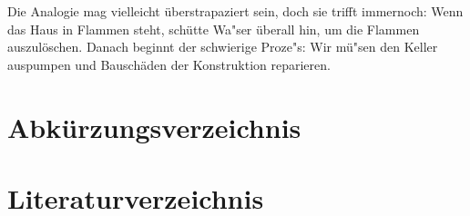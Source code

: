 \documentclass[
        onecolumn,
        a4paper,
        abstracton,
        parskip=half
        ,final
        ]{scrartcl}
\begin{document}
Die Analogie mag vielleicht {\"u}berstrapaziert sein, doch sie trifft immernoch: Wenn das Haus in Flammen steht, sch{\"u}tte Wa{"s}er {\"u}berall hin, um die Flammen auszul{\"o}schen. Danach beginnt der schwierige Proze{"s}: Wir m{\"u}{"s}en den Keller auspumpen und Bausch{\"a}den der Konstruktion reparieren.


\clearpage

\section{Abk{\"u}rzungsverzeichnis}
	\label{sec5:Abkuerzungsverzeichnis}

\begin{acronym}[ESZB]


\end{acronym}

\vspace{10pt}
	\newpage
  	\singlespacing



\section{Literaturverzeichnis}
	\label{sec6:Literaturverzeichnis}
	\newpage





\end{document}
